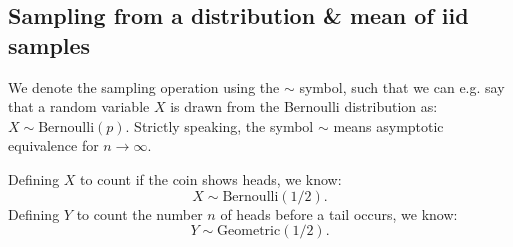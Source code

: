 \documentclass{article}
\begin{document}
\subsection{Sampling from a distribution \& mean of iid samples}
We denote the sampling operation using the $\sim$ symbol, such that we can e.g. say that a random variable $X$ is drawn from the Bernoulli distribution as: $X \sim \text{Bernoulli}(p)$. Strictly speaking, the symbol $\sim$ means asymptotic equivalence for $n\to\infty$.
\begin{testexample}
    Defining $X$ to count if the coin shows heads, we know:
    \begin{equation}
        X\sim\text{Bernoulli}(1/2).
    \end{equation}
    Defining $Y$ to count the number $n$ of heads before a tail occurs, we know:
    \begin{equation}
        Y\sim\text{Geometric}(1/2).
    \end{equation}
\end{testexample}
\end{document}
